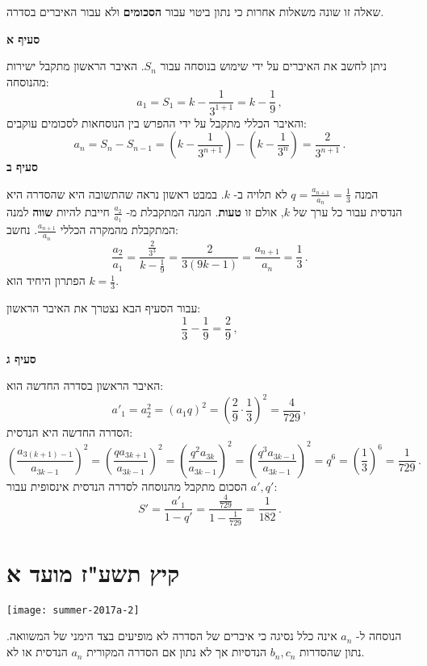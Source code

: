 שאלה זו שונה משאלות אחרות כי נתון ביטוי עבור
\textbf{הסכומים}
ולא עבור האיברים בסדרה.

\smallskip

\textbf{סעיף א}

ניתן לחשב את האיברים על ידי שימוש בנוסחה עבור
$S_n$.
האיבר הראשון מתקבל ישירות מהנוסחה:
\[
a_1=S_1=k-\frac{1}{3^{1+1}}=k-\frac{1}{9}\,,
\]
והאיבר הכללי מתקבל על ידי ההפרש בין הנוסחאות לסכומים עוקבים:
\[
a_n=S_{n}-S_{n-1}=\left(k-\frac{1}{3^{n+1}}\right)-\left(k-\frac{1}{3^{n}}\right)=\frac{2}{3^{n+1}}\,.
\]
\textbf{סעיף ב}

המנה
$q=\displaystyle\frac{a_{n+1}}{a_{n}}=\frac{1}{3}$
לא תלויה ב-%
$k$.
במבט ראשון נראה שהתשובה היא שהסדרה היא הנדסית עבור כל ערך של
$k$,
אולם זו
\textbf{טעות}.
המנה המתקבלת מ-%
$\displaystyle\frac{a_2}{a_1}$
חייבת להיות
\textbf{שווה}
למנה המתקבלת מהמקרה הכללי
$\displaystyle\frac{a_{n+1}}{a_{n}}$.
נחשב:
\[
\frac{a_2}{a_1}=\frac{\displaystyle\frac{2}{3^3}}{\displaystyle k-\frac{1}{9}} =  \frac{2}{3(9k-1)} =\frac{a_{n+1}}{a_n}=\frac{1}{3}\,.
\]
הפתרון היחיד הוא
$\displaystyle k=\frac{1}{3}$.

עבור הסעיף הבא נצטרך את האיבר הראשון:
\[
\displaystyle \frac{1}{3}-\frac{1}{9}=\frac{2}{9}\,,
\]

\np

\textbf{סעיף ג}

האיבר הראשון בסדרה החדשה הוא:
\[
a'_1 = a_2^2=\left(a_1q\right)^2=\left(\frac{2}{9}\cdot\frac{1}{3}\right)^2=\frac{4}{729}\,,
\]
הסדרה החדשה היא הנדסית:
\[
\left(\frac{a_{3(k+1)-1}}{a_{3k-1}}\right)^2 =  \left(\frac{qa_{3k+1}}{a_{3k-1}}\right)^2=\left(\frac{q^2a_{3k}}{a_{3k-1}}\right)^2=\left(\frac{q^3a_{3k-1}}{a_{3k-1}}\right)^2=q^6=\left(\frac{1}{3}\right)^6=\frac{1}{729}\,.
\]
הסכום מתקבל מהנוסחה לסדרה הנדסית אינסופית עבור
$a', q'$:
\[
S'=\frac{a'_1}{1-q'}=
\frac{\displaystyle\frac{4}{729}}{1-\displaystyle\frac{1}{729}}= \frac{1}{182}\,.
\]

\np
\section{קיץ תשע"ז מועד א}

\begin{center}
\texttt{[image: summer-2017a-2]}
\end{center}
הנוסחה ל-%
$a_n$
אינה כלל נסיגה כי איברים של הסדרה לא מופיעים בצד הימני של המשוואה. נתון שהסדרות 
$b_n,c_n$
הנדסיות אך לא נתון אם הסדרה המקורית
$a_n$
הנדסית או לא.

